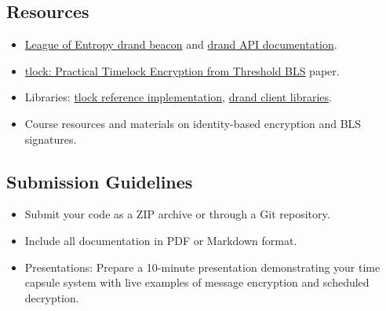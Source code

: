 \documentclass[10pt,a4paper,american]{exam}
\begin{document}
\subsection*{Resources}
\begin{itemize}
	\item \href{https://drand.love/}{League of Entropy drand beacon} and \href{https://api.drand.sh/}{drand API documentation}.
	\item \href{https://appliedcryptography.page/paper/\#tlock-bls}{tlock: Practical Timelock Encryption from Threshold BLS} paper.
	\item Libraries: \href{https://github.com/drand/tlock}{tlock reference implementation}, \href{https://github.com/drand/drand-client}{drand client libraries}.
	\item Course resources and materials on identity-based encryption and BLS signatures.
\end{itemize}

\subsection*{Submission Guidelines}
\begin{itemize}
	\item Submit your code as a ZIP archive or through a Git repository.
	\item Include all documentation in PDF or Markdown format.
	\item Presentations: Prepare a 10-minute presentation demonstrating your time capsule system with live examples of message encryption and scheduled decryption.
\end{itemize}
\end{document}
